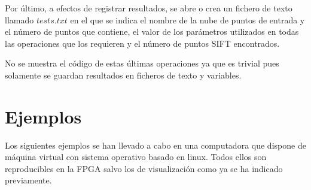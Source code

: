  Por último, a efectos de registrar resultados, se abre o crea un fichero de texto llamado $tests.txt$ en el que se indica el nombre de la nube de puntos de entrada y el número de puntos que contiene, el valor de los parámetros utilizados en todas las operaciones que los requieren y el número de puntos SIFT encontrados.
 
 \iffalse
\begin{lstlisting}[language=C++,breaklines]
  std::fstream fs;
  fs.open("tests.txt", std::fstream::app);
  
  fs << "filename: " << filename << std::endl;
  
  fs << std::endl <<  "Normal estimation radius search: " << radius_search << std::endl; 
  fs << "Minimum scale: " << min_scale << std::endl;
  fs << "Number of octaves: " << n_octaves << std::endl;
  fs << "Number of scales per octave: " << n_scales_per_octave << std::endl;
  fs << "Minimum contrast: " << min_contrast << std::endl;

  fs << std::endl << "Normal estimation time (s): " << normal_estimation_time << std::endl;
  fs << "SIFT points estimation time (s): " << sift_estimation_time << std::endl;
  fs << "Number of SIFT points found: " << sift_points << std::endl;

  fs << "---------------------\n----------------------\n";
  fs.close();
  return 0;
}
\end{lstlisting}
\fi

No se muestra el código de estas últimas operaciones ya que es trivial pues solamente se guardan resultados en ficheros de texto y variables.

\section{Ejemplos}
Los siguientes ejemplos se han llevado a cabo en una computadora que dispone de máquina virtual con sistema operativo basado en linux. Todos ellos son reproducibles en la FPGA salvo los de visualización como ya se ha indicado previamente.

